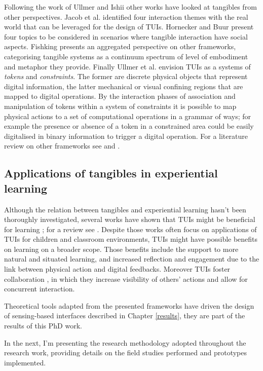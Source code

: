 Following the work of Ullmer and Ishii other works have looked at tangibles from other perspectives. Jacob et al. \autocite*{Jacob:2008vm} identified four interaction themes with the real world that can be leveraged for the design of TUIs. Hornecker and Buur \autocite*{Hornecker:2006uq} present four topics to be considered in scenarios where tangible interaction have social aspects. Fishking \autocite{Fishkin:2004uv} presents an aggregated perspective on other frameworks, categorising tangible systems as a continuum spectrum of level of embodiment and metaphor they provide. Finally Ullmer et al. \autocite{Ullmer:2005jz} envision TUIs as a systems of \emph{tokens} and \emph{constraints}. The former are discrete physical objects that represent digital information, the latter mechanical or visual confining regions that are mapped to digital operations. By the interaction phases of association and manipulation of tokens within a system of constraints it is possible to map physical actions to a set of computational operations in a grammar of ways; for example the presence or absence of a token in a constrained area could be easily digitalised in binary information to trigger a digital operation. For a literature review on other frameworks see \autocite{Mazalek:2009uy} and \autocite{Shaer:2009fx}.

\subsection{Applications of tangibles in experiential learning}\label{applications-of-tangibles-in-experiential-learning}

Although the relation between tangibles and experiential learning hasn't been thoroughly investigated, several works have shown that TUIs might be beneficial for learning \autocite{Marshall:2007dr}; for a review see \autocite{omalley:hal-00190328}. Despite those works often focus on applications of TUIs for children and classroom environments, TUIs might have possible benefits on learning on a broader scope. Those benefits include the support to more natural \autocite{Terrenghi:2005gq} and situated \autocite{Klemmer:2006ez} learning, and increased reflection and engagement \autocite{Rogers:2006te} due to the link between physical action and digital feedbacks. Moreover TUIs foster collaboration \autocite{Rogers:2003tt}, in which they increase visibility of others' actions and allow for concurrent interaction.

Theoretical tools adapted from the presented frameworks have driven the design of sensing-based interfaces described in Chapter \ref{results}, they are part of the results of this PhD work.

In the next, I'm presenting the research methodology adopted throughout the research work, providing details on the field studies performed and prototypes implemented. 
